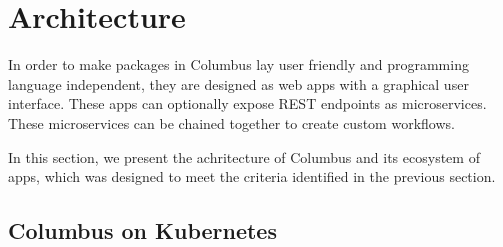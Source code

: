 \section{Architecture}
In order to make packages in Columbus lay user friendly and programming language independent, they 
are designed as web apps with a graphical user interface. These apps can optionally expose REST 
endpoints as microservices. These microservices can be chained together to create custom workflows.

In this section, we present the achritecture of Columbus and its ecosystem of apps,
which was designed to meet the criteria identified in the previous section.

\subsection{Columbus on Kubernetes}

